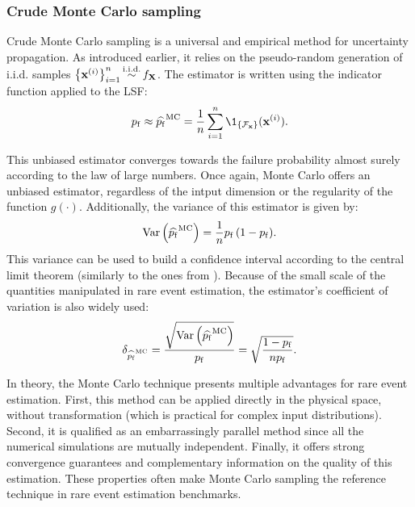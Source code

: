 \subsubsection{Crude Monte Carlo sampling}
Crude Monte Carlo sampling is a universal and empirical method for uncertainty propagation. 
As introduced earlier, it relies on the pseudo-random generation of i.i.d. samples $\left\{{\bf x}^{(i)}\right\}_{i=1}^n \mathop{\sim}\limits^{\mathrm{i.i.d.}} f_{\bf X}$.   
The estimator is written using the indicator function applied to the LSF: 
\begin{equation}
    \pf \approx \what{\pf}^{\textrm{MC}} = \frac1n \sum_{i=1}^{n} \1_{\{\iF_\bx\}}(\bx^{(i)}).
\end{equation} 

This unbiased estimator converges towards the failure probability almost surely according to the law of large numbers. 
Once again, Monte Carlo offers an unbiased estimator, regardless of the intput dimension or the regularity of the function $g(\cdot)$.   
Additionally, the variance of this estimator is given by:
\begin{equation}
    \operatorname{Var}\left(\widehat{p_\mathrm{f}}^{\textrm{MC}}\right) = \frac1n p_\mathrm{f} \, (1 - p_\mathrm{f}).
\end{equation} 
This variance can be used to build a confidence interval according to the central limit theorem (similarly to the ones from ). 
Because of the small scale of the quantities manipulated in rare event estimation, the estimator's coefficient of variation is also widely used: 
\begin{equation}
    \delta_{\widehat{p_\mathrm{f}}^{\textrm{MC}}} = \frac{\sqrt{\operatorname{Var}\left(\widehat{p_\mathrm{f}}^{\textrm{MC}}\right)}}{p_\mathrm{f}}
                                      = \sqrt{\frac{1 - p_\mathrm{f}}{n p_\mathrm{f}}}.
\end{equation}

In theory, the Monte Carlo technique presents multiple advantages for rare event estimation. 
First, this method can be applied directly in the physical space, without transformation (which is practical for complex input distributions). 
Second, it is qualified as an embarrassingly parallel method since all the numerical simulations are mutually independent. 
Finally, it offers strong convergence guarantees and complementary information on the quality of this estimation. 
These properties often make Monte Carlo sampling the reference technique in rare event estimation benchmarks. 

